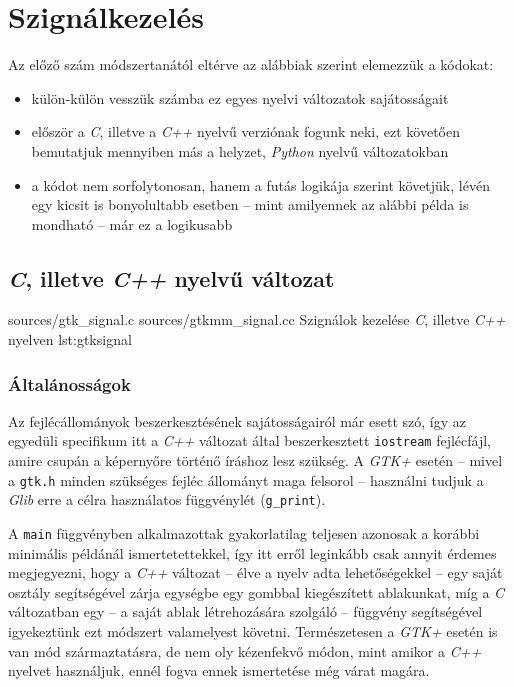 \section{Szignálkezelés}

Az előző szám módszertanától eltérve az alábbiak szerint elemezzük a kódokat:

\begin{itemize}
 \item külön-külön vesszük számba ez egyes nyelvi változatok sajátosságait
 \item először a \textit{C}, illetve a \textit{C++} nyelvű verziónak fogunk neki, ezt követően bemutatjuk mennyiben más a helyzet, \textit{Python} nyelvű változatokban
 \item a kódot nem sorfolytonosan, hanem a futás logikája szerint követjük, lévén egy kicsit is bonyolultabb esetben -- mint amilyennek az alábbi példa is mondható -- már ez a logikusabb
\end{itemize}

\subsection{\textit{C}, illetve \textit{C++} nyelvű változat}

\lstdoublecsource
{sources/gtk_signal.c}
{sources/gtkmm_signal.cc}
{Szignálok kezelése \textit{C}, illetve \textit{C++} nyelven}
{lst:gtksignal}

\subsubsection{Általánosságok}

\begin{description}
 \item[\ref{gtksignalc:includebegin} - \ref{gtksignalcc:includeend} sor] Az fejlécállományok beszerkesztésének sajátosságairól már esett szó, így az egyedüli specifikum itt a \textit{C++} változat által beszerkesztett \texttt{iostream} fejlécfájl, amire csupán a képernyőre történő íráshoz lesz szükség. A \textit{GTK+} esetén -- mivel a \texttt{gtk.h} minden szükséges fejléc állományt maga felsorol -- használni tudjuk a \textit{Glib} erre a célra használatos függvénylét (\texttt{g\_print}).

 \item[\ref{gtksignalc:main} - \ref{gtksignalc:end} sor] A \texttt{main} függvényben alkalmazottak gyakorlatilag teljesen azonosak a korábbi minimális példánál ismertetettekkel, így itt erről leginkább csak annyit érdemes megjegyezni, hogy a \textit{C++} változat -- élve a nyelv adta lehetőségekkel -- egy saját osztály segítségével zárja egységbe egy gombbal kiegészített ablakunkat, míg a \textit{C} változatban egy -- a saját ablak létrehozására szolgáló -- függvény segítségével igyekeztünk ezt módszert valamelyest követni. Természetesen a \textit{GTK+} esetén is van mód származtatásra, de nem oly kézenfekvő módon, mint amikor a \textit{C++} nyelvet használjuk, ennél fogva ennek ismertetése még várat magára.
\end{description}

